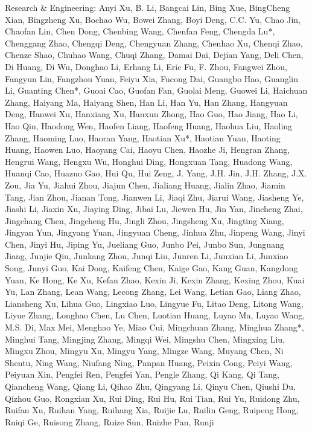 \documentclass[
  10
]{article}
\begin{document}
Research \& Engineering: Anyi Xu, B. Li, Bangcai Lin, Bing Xue,
BingCheng Xian, Bingzheng Xu, Bochao Wu, Bowei Zhang, Boyi Deng, C.C.
Yu, Chao Jin, Chaofan Lin, Chen Dong, Chenbing Wang, Chenfan Feng,
Chengda Lu*, Chenggang Zhao, Chengqi Deng, Chengyuan Zhang, Chenhao Xu,
Chenqi Zhao, Chenze Shao, Chuhao Wang, Chuqi Zhang, Damai Dai, Dejian
Yang, Deli Chen, Di Huang, Di Wu, Donghao Li, Erhang Li, Eric Fu, F.
Zhou, Fangwei Zhou, Fangyun Lin, Fangzhou Yuan, Feiyu Xia, Fucong Dai,
Guangbo Hao, Guanglin Li, Guanting Chen*, Guoai Cao, Guofan Fan, Guolai
Meng, Guowei Li, Haichuan Zhang, Haiyang Ma, Haiyang Shen, Han Li, Han
Yu, Han Zhang, Hangyuan Deng, Hanwei Xu, Hanxiang Xu, Hanxun Zhong, Hao
Guo, Hao Jiang, Hao Li, Hao Qin, Haodong Wen, Haofen Liang, Haofeng
Huang, Haohua Liu, Haoling Zhang, Haoming Luo, Haoran Yang, Haotian Xu*,
Haotian Yuan, Haoting Huang, Haowen Luo, Haoyang Cai, Haoyu Chen, Haozhe
Ji, Hengran Zhang, Hengrui Wang, Hengxu Wu, Honghui Ding, Hongxuan Tang,
Huadong Wang, Huanqi Cao, Huazuo Gao, Hui Qu, Hui Zeng, J. Yang, J.H.
Jin, J.H. Zhang, J.X. Zou, Jia Yu, Jiahui Zhou, Jiajun Chen, Jialiang
Huang, Jialin Zhao, Jiamin Tang, Jian Zhou, Jianan Tong, Jianwen Li,
Jiaqi Zhu, Jiarui Wang, Jiasheng Ye, Jiashi Li, Jiaxin Xu, Jiaying Ding,
Jibai Lu, Jiewen Hu, Jin Yan, Jincheng Zhai, Jingchang Chen, Jingcheng
Hu, Jingli Zhou, Jingsheng Xu, Jingting Xiang, Jingyan Yun, Jingyang
Yuan, Jingyuan Cheng, Jinhua Zhu, Jinpeng Wang, Jinyi Chen, Jinyi Hu,
Jiping Yu, Jueliang Guo, Junbo Pei, Junbo Sun, Junguang Jiang, Junjie
Qiu, Junkang Zhou, Junqi Liu, Junren Li, Junxian Li, Junxiao Song, Junyi
Guo, Kai Dong, Kaifeng Chen, Kaige Gao, Kang Guan, Kangdong Yuan, Ke
Hong, Ke Xu, Kefan Zhao, Kexin Ji, Kexin Zhang, Kexing Zhou, Kuai Yu,
Lan Zhang, Lean Wang, Lecong Zhang, Lei Wang, Letian Gao, Liang Zhao,
Liansheng Xu, Lihua Guo, Lingxiao Luo, Lingyue Fu, Litao Deng, Litong
Wang, Liyue Zhang, Longhao Chen, Lu Chen, Luotian Huang, Luyao Ma, Luyao
Wang, M.S. Di, Max Mei, Menghao Ye, Miao Cui, Mingchuan Zhang, Minghua
Zhang*, Minghui Tang, Mingjing Zhang, Mingqi Wei, Mingshu Chen, Mingxing
Liu, Mingxu Zhou, Mingyu Xu, Mingyu Yang, Mingze Wang, Muyang Chen, Ni
Shentu, Ning Wang, Niufang Ning, Panpan Huang, Peixin Cong, Peiyi Wang,
Peiyuan Xin, Pengfei Ren, Pengfei Yan, Pengle Zhang, Qi Kang, Qi Tang,
Qiancheng Wang, Qiang Li, Qihao Zhu, Qingyang Li, Qinyu Chen, Qiushi Du,
Qizhou Guo, Rongxian Xu, Rui Ding, Rui Hu, Rui Tian, Rui Yu, Ruidong
Zhu, Ruifan Xu, Ruihan Yang, Ruihang Xia, Ruijie Lu, Ruilin Geng,
Ruipeng Hong, Ruiqi Ge, Ruisong Zhang, Ruize Sun, Ruizhe Pan, Runji
\end{document}
